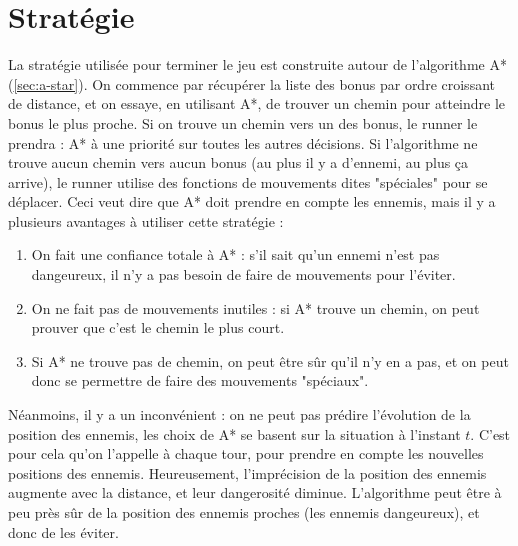 \chapter{Stratégie}
\label{cp:strategie}

La stratégie utilisée pour terminer le jeu est construite autour de l'algorithme A* (\autoref{sec:a-star}).
\newline
On commence par récupérer la liste des bonus par ordre croissant de distance, et on essaye, en utilisant A*, de trouver un chemin pour atteindre le bonus le plus proche.
\newline
Si on trouve un chemin vers un des bonus, le runner le prendra : A* à une priorité sur toutes les autres décisions.
\newline
Si l'algorithme ne trouve aucun chemin vers aucun bonus (au plus il y a d'ennemi, au plus ça arrive), le runner utilise des fonctions de mouvements dites "spéciales" pour se déplacer.
\newline\newline
Ceci veut dire que A* doit prendre en compte les ennemis, mais il y a plusieurs avantages à utiliser cette stratégie :

\begin{enumerate}
    \item On fait une confiance totale à A* : s'il sait qu'un ennemi n'est pas dangeureux, il n'y a pas besoin de faire de mouvements pour l'éviter.
    \item On ne fait pas de mouvements inutiles : si A* trouve un chemin, on peut prouver que c'est le chemin le plus court.
    \item Si A* ne trouve pas de chemin, on peut être sûr qu'il n'y en a pas, et on peut donc se permettre de faire des mouvements "spéciaux".
\end{enumerate}
Néanmoins, il y a un inconvénient : on ne peut pas prédire l'évolution de la position des ennemis, les choix de A* se basent sur la situation à l'instant $t$.
C'est pour cela qu'on l'appelle à chaque tour, pour prendre en compte les nouvelles positions des ennemis.
\newline\newline
Heureusement, l'imprécision de la position des ennemis augmente avec la distance, et leur dangerosité diminue.
L'algorithme peut être à peu près sûr de la position des ennemis proches (les ennemis dangeureux), et donc de les éviter.

\newpage

